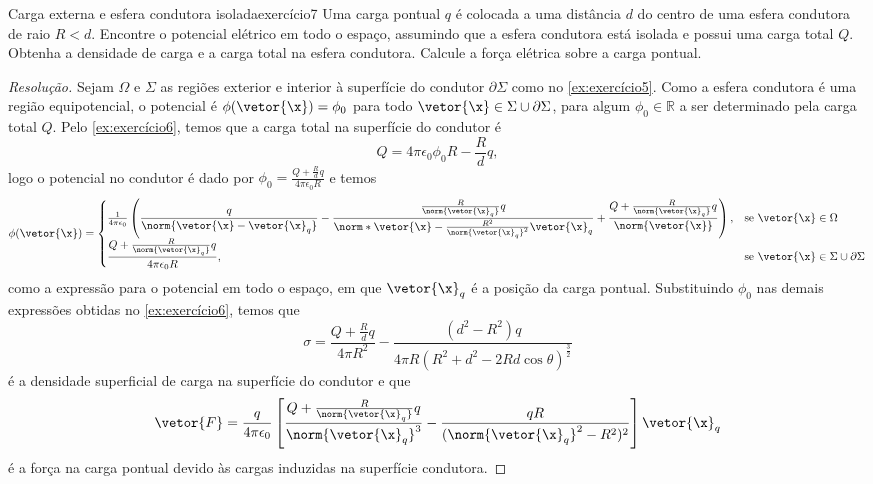 \begin{exercício}{Carga externa e esfera condutora isolada}{exercício7}
    Uma carga pontual \(q\) é colocada a uma distância \(d\) do centro de uma esfera condutora de raio \(R < d\). Encontre o potencial elétrico em todo o espaço, assumindo que a esfera condutora está isolada e possui uma carga total \(Q\). Obtenha a densidade de carga e a carga total na esfera condutora. Calcule a força elétrica sobre a carga pontual.
\end{exercício}
\begin{proof}[Resolução]
    Sejam \(\Omega\) e \(\Sigma\) as regiões exterior e interior à superfície do condutor \(\partial \Sigma\) como no \cref{ex:exercício5}. Como a esfera condutora é uma região equipotencial, o potencial é \(\phi(\vetor{\x}) = \phi_0\) para todo \(\vetor{\x} \in \Sigma \cup \partial \Sigma\), para algum \(\phi_0 \in \mathbb{R}\) a ser determinado pela carga total \(Q\). Pelo \cref{ex:exercício6}, temos que a carga total na superfície do condutor é
    \begin{equation*}
        Q = 4\pi \epsilon_0 \phi_0 R - \frac{R}{d}q,
    \end{equation*}
    logo o potencial no condutor é dado por \(\phi_0 = \frac{Q + \frac{R}{d}q}{4\pi \epsilon_0 R}\) e temos
    \begin{equation*}
        \phi(\vetor{\x}) = \begin{cases}
            \frac{1}{4\pi \epsilon_0} \left(\dfrac{q}{\norm{\vetor{\x} - \vetor{\x}_q}} - \dfrac{\frac{R}{\norm{\vetor{\x}_q}}q}{\norm*{\vetor{\x} - \frac{R^2}{\norm{\vetor{\x}_q}^2}\vetor{\x}_q}}+ \dfrac{Q + \frac{R}{\norm{\vetor{\x}_q}}q}{\norm{\vetor{\x}}}\right) ,&\text{se }\vetor{\x} \in \Omega\\
            \dfrac{Q + \frac{R}{\norm{\vetor{\x}_q}}q}{4 \pi \epsilon_0 R}, &\text{se } \vetor{\x}\in \Sigma \cup \partial \Sigma
        \end{cases}
    \end{equation*}
    como a expressão para o potencial em todo o espaço, em que \(\vetor{\x}_q\) é a posição da carga pontual. Substituindo \(\phi_0\) nas demais expressões obtidas no \cref{ex:exercício6}, temos que
    \begin{equation*}
        \sigma = \frac{Q + \frac{R}{d}q}{4\pi R^2}-\frac{(d^2 - R^2)q}{4\pi R(R^2 + d^2 - 2Rd \cos\theta)^{\frac32}}
    \end{equation*}
    é a densidade superficial de carga na superfície do condutor e que
    \begin{equation*}
        \vetor{F} = \frac{q}{4\pi \epsilon_0}\left[\frac{Q + \frac{R}{\norm{\vetor{\x}_q}}q}{\norm{\vetor{\x}_q}^3}-\frac{q R}{(\norm{\vetor{\x}_q}^2 - R^2)^2}\right]\vetor{\x}_q
    \end{equation*}
    é a força na carga pontual devido às cargas induzidas na superfície condutora.
\end{proof}
